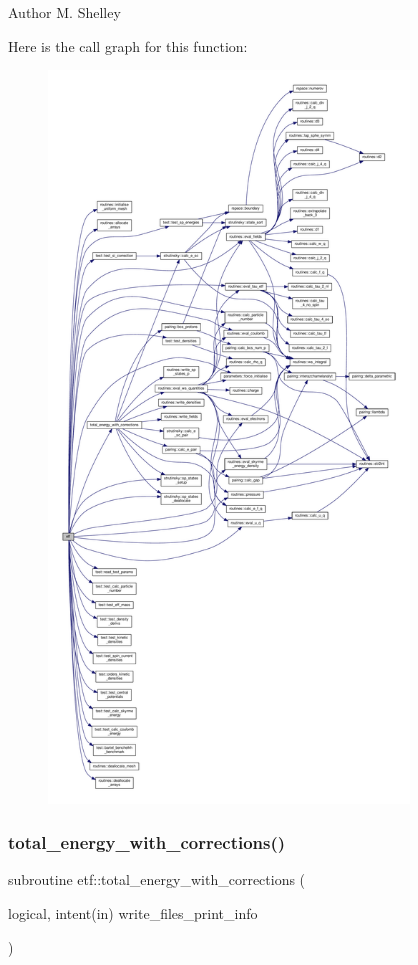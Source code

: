 \begin{DoxyAuthor}{Author}
M. Shelley 
\end{DoxyAuthor}
Here is the call graph for this function\+:
\nopagebreak
\begin{figure}[H]
\begin{center}
\leavevmode
\includegraphics[height=550pt]{etf_8f90_a77a926a33d4e2b4d7c47fa641fc32e57_cgraph}
\end{center}
\end{figure}
\mbox{\label{etf_8f90_a48fed0623ded12967501f647461fb1cb}} 
\subsubsection{\texorpdfstring{total\+\_\+energy\+\_\+with\+\_\+corrections()}{total\_energy\_with\_corrections()}}
{\footnotesize\ttfamily subroutine etf\+::total\+\_\+energy\+\_\+with\+\_\+corrections (\begin{DoxyParamCaption}\item[{logical, intent(in)}]{write\+\_\+files\+\_\+print\+\_\+info }\end{DoxyParamCaption})}



